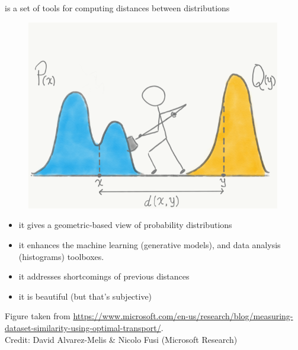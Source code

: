 \documentclass[pdf,aspectratio=169,10pt]{beamer}
\begin{document}
\begin{frame}{
}
 is a set of tools for computing distances between distributions
\vspace{1em}

\begin{minipage}{0.5\textwidth}
\begin{figure}
  \includegraphics[width=0.99\textwidth]{../img/OT_shovel}
\end{figure}    
\end{minipage}
\hfill
\begin{minipage}{0.45\textwidth}
\begin{itemize}
    \item it gives a geometric-based view of probability distributions 
    \item it enhances the machine learning (generative models), and data analysis (histograms) toolboxes.
    \item it addresses shortcomings of previous distances
    \item it is beautiful (but that's subjective)
\end{itemize}
\end{minipage}
\vfill

\tiny{Figure taken from \url{https://www.microsoft.com/en-us/research/blog/measuring-dataset-similarity-using-optimal-transport/}. \\Credit: David Alvarez-Melis \&  Nicolo Fusi (Microsoft Research)}

\end{frame}
\end{document}
